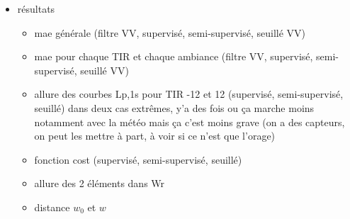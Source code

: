 \begin{itemize}


\item résultats
\begin{itemize}
\item mae générale (filtre VV, supervisé, semi-supervisé, seuillé VV)
\item mae pour chaque TIR et chaque ambiance (filtre VV, supervisé, semi-supervisé, seuillé VV)
\item allure des courbes Lp,1s pour TIR -12 et 12 (supervisé, semi-supervisé, seuillé) dans deux cas extrêmes, y'a des fois ou ça marche moins notamment avec la météo mais ça c'est moins grave (on a des capteurs, on peut les mettre à part, à voir si ce n'est que l'orage)
\item fonction cost (supervisé, semi-supervisé, seuillé)
\item allure des 2 éléments dans Wr
\item distance $w_0$ et $w$
\end{itemize}
\end{itemize}





%
